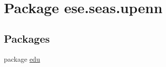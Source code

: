 \hypertarget{namespaceese_1_1seas_1_1upenn}{}\section{Package ese.\+seas.\+upenn}
\label{namespaceese_1_1seas_1_1upenn}
\subsection*{Packages}
\begin{DoxyCompactItemize}
\item 
package \hyperlink{namespaceese_1_1seas_1_1upenn_1_1edu}{edu}
\end{DoxyCompactItemize}
